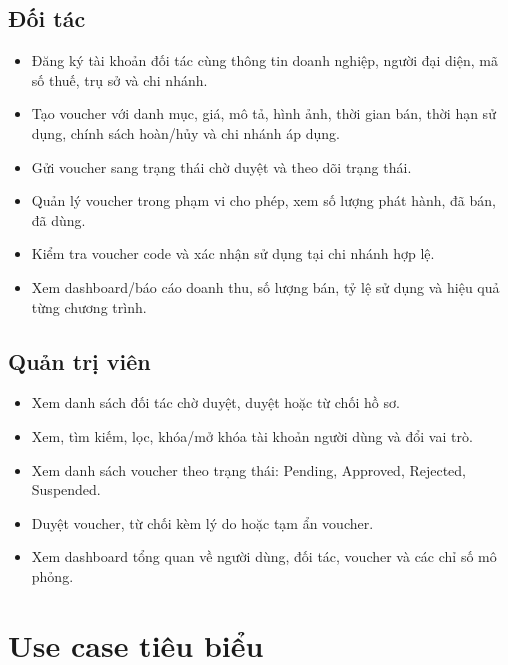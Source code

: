 \subsection{Đối tác}

\begin{itemize}[leftmargin=1.2cm]
    \item Đăng ký tài khoản đối tác cùng thông tin doanh nghiệp, người đại diện, mã số thuế, trụ sở và chi nhánh.
    \item Tạo voucher với danh mục, giá, mô tả, hình ảnh, thời gian bán, thời hạn sử dụng, chính sách hoàn/hủy và chi nhánh áp dụng.
    \item Gửi voucher sang trạng thái chờ duyệt và theo dõi trạng thái.
    \item Quản lý voucher trong phạm vi cho phép, xem số lượng phát hành, đã bán, đã dùng.
    \item Kiểm tra voucher code và xác nhận sử dụng tại chi nhánh hợp lệ.
    \item Xem dashboard/báo cáo doanh thu, số lượng bán, tỷ lệ sử dụng và hiệu quả từng chương trình.
\end{itemize}

\subsection{Quản trị viên}

\begin{itemize}[leftmargin=1.2cm]
    \item Xem danh sách đối tác chờ duyệt, duyệt hoặc từ chối hồ sơ.
    \item Xem, tìm kiếm, lọc, khóa/mở khóa tài khoản người dùng và đổi vai trò.
    \item Xem danh sách voucher theo trạng thái: Pending, Approved, Rejected, Suspended.
    \item Duyệt voucher, từ chối kèm lý do hoặc tạm ẩn voucher.
    \item Xem dashboard tổng quan về người dùng, đối tác, voucher và các chỉ số mô phỏng.
\end{itemize}

\section{Use case tiêu biểu}

